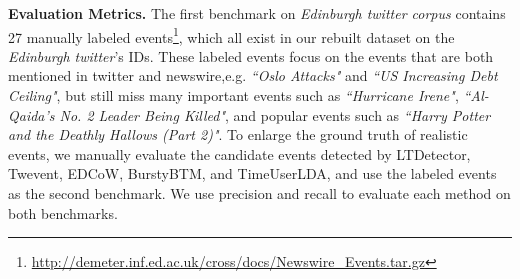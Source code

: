 \documentclass{article}
\begin{document}
\textbf{Evaluation Metrics.} 
The first benchmark on \textit{Edinburgh twitter corpus} contains 27 manually labeled events\cite{petrovic2013can}\footnote{\url{http://demeter.inf.ed.ac.uk/cross/docs/Newswire_Events.tar.gz}}, which all exist in our rebuilt dataset on the \textit{Edinburgh twitter}'s IDs.
These labeled events focus on the events that are both mentioned in twitter and newswire,e.g. \textit{``Oslo Attacks"} and \textit{``US Increasing Debt Ceiling"}, but still miss many important events such as \textit{``Hurricane Irene"}, \textit{``Al-Qaida's No. 2 Leader Being Killed"}, and popular events such as \textit{``Harry Potter and the Deathly Hallows (Part 2)"}.
To enlarge the ground truth of realistic events, we manually evaluate the candidate events detected by LTDetector, Twevent, EDCoW, BurstyBTM, and TimeUserLDA, and  use the labeled events as the second benchmark.
We use precision and recall to evaluate each method on both benchmarks.
\begin{table}[h]
\scriptsize
\centering
{}
\caption{Overall Performance on Event Detection}
\end{table}
\end{document}

